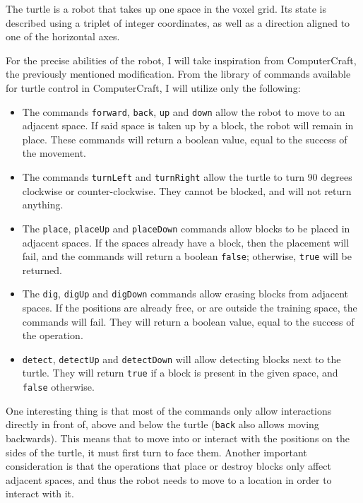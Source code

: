 \documentclass{report}
\begin{document}
The turtle is a robot that takes up one space in the voxel grid. Its state is described using a triplet of integer coordinates, as well as a direction aligned to one of the horizontal axes.

For the precise abilities of the robot, I will take inspiration from ComputerCraft, the previously mentioned modification. From the library of commands available for turtle control in ComputerCraft\cite{ccwiki:turtle}, I will utilize only the following:

\begin{itemize}
    \item The commands \texttt{forward}, \texttt{back}, \texttt{up} and \texttt{down} allow the robot to move to an adjacent space. If said space is taken up by a block, the robot will remain in place. These commands will return a boolean value, equal to the success of the movement.
    \item The commands \texttt{turnLeft} and \texttt{turnRight} allow the turtle to turn 90 degrees clockwise or counter-clockwise. They cannot be blocked, and will not return anything.
    \item The \texttt{place}, \texttt{placeUp} and \texttt{placeDown} commands allow blocks to be placed in adjacent spaces. If the spaces already have a block, then the placement will fail, and the commands will return a boolean \texttt{false}; otherwise, \texttt{true} will be returned.
    \item The \texttt{dig}, \texttt{digUp} and \texttt{digDown} commands allow erasing blocks from adjacent spaces. If the positions are already free, or are outside the training space, the commands will fail. They will return a boolean value, equal to the success of the operation.
    \item \texttt{detect}, \texttt{detectUp} and \texttt{detectDown} will allow detecting blocks next to the turtle. They will return \texttt{true} if a block is present in the given space, and \texttt{false} otherwise.
\end{itemize}

One interesting thing is that most of the commands only allow interactions directly in front of, above and below the turtle (\texttt{back} also allows moving backwards). This means that to move into or interact with the positions on the sides of the turtle, it must first turn to face them. Another important consideration is that the operations that place or destroy blocks only affect adjacent spaces, and thus the robot needs to move to a location in order to interact with it.
\end{document}
